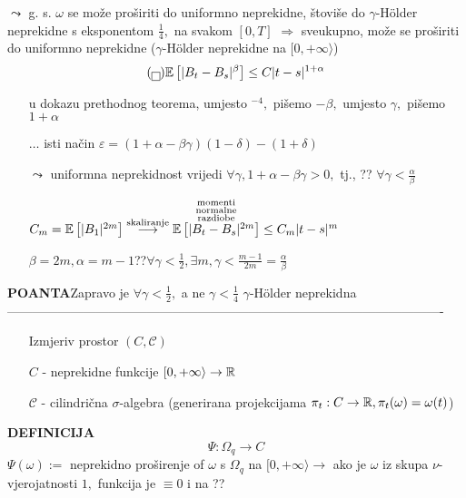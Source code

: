 \documentclass{article}
\begin{document}
\(\leadsto\) g. s. \(\omega\) se može proširiti do uniformno neprekidne, štoviše do  \(\gamma\)-H\"older neprekidne s eksponentom \(\frac14,\) na svakom \([0,T]\) \(\Rightarrow\) sveukupno, može se proširiti do uniformno neprekidne (\(\gamma\)-H\"older neprekidne na \([0,+\infty\rangle\)) \[(\boxed{})\Bbb E\left[|B_t-B_s|^\beta\right]\le C|t-s|^{1+\alpha}\]
\begin{enumerate}
    \item[\ding{228}] u dokazu prethodnog teorema, umjesto \({}^{-4},\) pišemo  \(-\beta,\) umjesto \(\gamma,\) pišemo \(1+\alpha\)
    \item[\ding{228}] \(\ldots\) isti način \(\varepsilon=(1+\alpha-\beta\gamma)(1-\delta)-(1+\delta)\)
    \item[\(\leadsto\)] uniformna neprekidnost vrijedi \(\forall\gamma,1+\alpha-\beta\gamma>0,\) tj., ?? \(\forall\gamma<\frac\alpha\beta\)
    \item[\ding{228}] \(C_m=\Bbb E\left[|B_1|^{2m}\right]\overset{\text{skaliranje}}{\longrightarrow}\overset{\substack{\text{momenti}\\\text{normalne}\\\text{razdiobe}}}{\Bbb E\left[|B_t-B_s|^{2m}\right]}\le C_m|t-s|^m\)
    \item[\ding{113}] \(\beta=2m,\alpha=m-1\)\newline ??\(\forall\gamma<\frac12,\exists m,\gamma<\frac{m-1}{2m}=\frac\alpha\beta\)
\end{enumerate}
\textbf{POANTA}\newline Zapravo je \(\forall\gamma<\frac12,\) a ne \(\gamma<\frac14\) \(\gamma\)-H\"older neprekidna\newline\newline-------------------------------------------------------------------------------------------------------
\begin{enumerate}
    \item[\ding{228}] Izmjeriv prostor \((C,\mathcal C)\)
    \item[\ding{228}] \(C\) - neprekidne funkcije \([0,+\infty\rangle\to\Bbb R\)
    \item[\ding{228}] \(\mathcal C\) - cilindrična \(\sigma\)-algebra (generirana projekcijama \(\pi_t:C\to\Bbb R,\pi_t(\omega)=\omega(t)\))
\end{enumerate}
\textbf{DEFINICIJA}  \[\Psi:\Omega_q\to C\]
\(\Psi(\omega):=\) neprekidno proširenje of \(\omega\) s \(\Omega_q\) na \([0,+\infty\rangle\)\newline \(\to\) ako je \(\omega\) iz skupa \(\nu\)-vjerojatnosti \(1,\) funkcija je \(\equiv0\) i na ??\newline\newline
\end{document}
